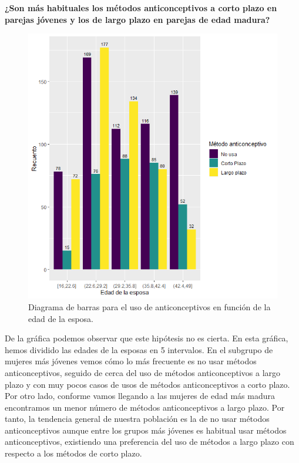 \documentclass[a4paper,12pt, oneside]{book}
\begin{document}
\textbf{¿Son más habituales los métodos anticonceptivos a corto plazo en parejas jóvenes y los de largo plazo en parejas de edad madura?}\\
\begin{figure}[H]
\centering
\includegraphics[scale=0.7]{images/hipo2.png}
\caption{Diagrama de barras para el uso de anticonceptivos en función de la edad de la esposa.}
\end{figure}

De la gráfica podemos observar que este hipótesis no es cierta. En esta gráfica, hemos dividido las edades de la esposas en 5 intervalos. En el subgrupo de mujeres más jóvenes vemos cómo lo más frecuente es no usar métodos anticonceptivos, seguido de cerca del uso de métodos anticonceptivos a largo plazo y con muy pocos casos de usos de métodos anticonceptivos a corto plazo. Por otro lado, conforme vamos llegando a las mujeres de edad más madura encontramos un menor número de métodos anticonceptivos a largo plazo. Por tanto, la tendencia general de nuestra población es la de no usar métodos anticonceptivos aunque entre los grupos más jóvenes es habitual usar métodos anticonceptivos, existiendo una preferencia del uso de métodos a largo plazo con respecto a los métodos de corto plazo.\\
\end{document}
